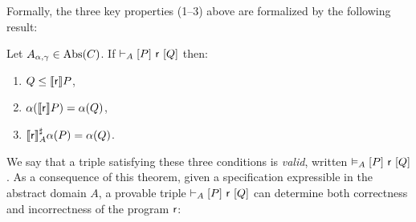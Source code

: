 Formally, the three key properties (1--3) above are formalized by the following result:

\begin{theorem}\label{th:sota:lcl-soundness}
	Let $A_{\alpha, \gamma} \in \text{\normalfont Abs}(C)$.
	If $\vdash_{A}\nobreak[P]~\mathsf{r}~[Q]$ then:
	\begin{enumerate}
		\item $Q \le \llbracket\mathsf{r}\rrbracket P$,
		\item $\alpha(\llbracket\mathsf{r}\rrbracket P) = \alpha(Q)$,
		\item $\llbracket\mathsf{r}\rrbracket^{\sharp}_{A} \alpha(P) = \alpha(Q)$.
	\end{enumerate}
\end{theorem}

We say that a triple satisfying these three conditions is \emph{valid}, written $\vDash_{A}\nobreak[P]~\mathsf{r}~[Q]$.
As a consequence of this theorem, given a specification expressible in the abstract domain $A$, a provable triple $\vdash_{A}\nobreak[P]~\mathsf{r}~[Q]$ can determine both correctness and incorrectness of the program $\mathsf{r}$:

